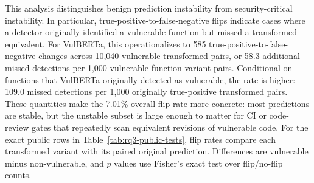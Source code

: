 \documentclass[a4paper,fleqn]{cas-dc}
\begin{document}
This analysis distinguishes benign prediction instability from
security-critical instability. In particular, true-positive-to-false-negative
flips indicate cases where a detector originally identified a vulnerable function
but missed a transformed equivalent. For VulBERTa, this operationalizes to 585
true-positive-to-false-negative changes across 10,040 vulnerable transformed
pairs, or 58.3 additional missed detections per 1,000 vulnerable
function-variant pairs. Conditional on functions that VulBERTa originally
detected as vulnerable, the rate is higher: 109.0 missed detections per 1,000
originally true-positive transformed pairs. These quantities make the 7.01\%
overall flip rate more concrete: most predictions are stable, but the unstable
subset is large enough to matter for CI or code-review gates that repeatedly
scan equivalent revisions of vulnerable code.
For the exact public rows in Table~\ref{tab:rq3-public-tests}, flip rates
compare each transformed variant with its paired original prediction.
Differences are vulnerable minus non-vulnerable, and $p$ values use Fisher's
exact test over flip/no-flip counts.

\begin{table}[t]
  \centering
  \caption{Label-specific prediction instability.}
  \label{tab:rq3}
\end{table}
\end{document}
